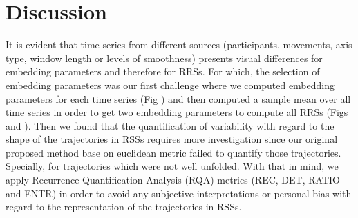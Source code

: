 \documentclass[fleqn,10pt]{wlscirep}
\begin{document}





\section*{Discussion}


%


It is evident that time series from different sources 
(participants, movements, axis type, window length or levels of smoothness) 
presents visual differences for embedding parameters and therefore for RRSs. 
For which, the selection of embedding parameters was our first challenge 
where we computed embedding parameters for each time series 
(Fig \label{fig:caoami}) and then computed a sample mean over 
all time series in order to get two embedding parameters 
to compute all RRSs (Figs \label{fig:rss_aHw10} and \label{fig:rss_aVw10}). 
Then we found that the quantification of variability with regard to 
the shape of the trajectories in RSSs requires more investigation 
since our original proposed method base on euclidean metric failed 
to quantify those trajectories. Specially, for trajectories which 
were not well unfolded. 
With that in mind, we apply 
Recurrence Quantification Analysis (RQA) metrics 
(REC, DET, RATIO and ENTR) in order to avoid any subjective interpretations 
or personal bias with regard to the representation of the trajectories in RSSs.
\end{document}

